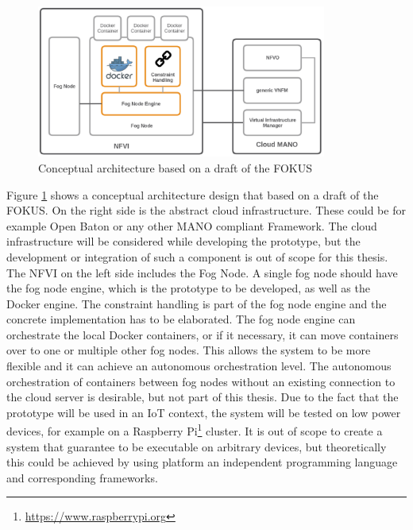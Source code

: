 \begin{figure}[H]
    \centering
    \includegraphics[width=0.85\textwidth]{resources/images/conceptual_architecture.png}
    \caption[Conceptual architecture based on a draft of the \ac{FOKUS}]{Conceptual architecture based on a draft of the FOKUS}
    \label{fig:conceptual_architecture}
\end{figure}

Figure \ref{fig:conceptual_architecture} shows a conceptual architecture design that based on a draft of the \ac{FOKUS}.
On the right side is the abstract cloud infrastructure.
These could be for example Open Baton or any other \ac{MANO} compliant Framework.
The cloud infrastructure will be considered while developing the prototype, but the development or integration of such a component is out of scope for this thesis.
The \ac{NFVI} on the left side includes the Fog Node.
A single fog node should have the fog node engine, which is the prototype to be developed, as well as the Docker engine.
The constraint handling is part of the fog node engine and the concrete implementation has to be elaborated.
The fog node engine can orchestrate the local Docker containers, or if it necessary, it can move containers over to one or multiple other fog nodes.
This allows the system to be more flexible and it can achieve an autonomous orchestration level.
The autonomous orchestration of containers between fog nodes without an existing connection to the cloud server is desirable, but not part of this thesis.
Due to the fact that the prototype will be used in an \ac{IoT} context, the system will be tested on low power devices, for example on a Raspberry Pi\footnote{\url{https://www.raspberrypi.org}} cluster.
It is out of scope to create a system that guarantee to be executable on arbitrary devices, but theoretically this could be achieved by using platform an independent programming language and corresponding frameworks.


